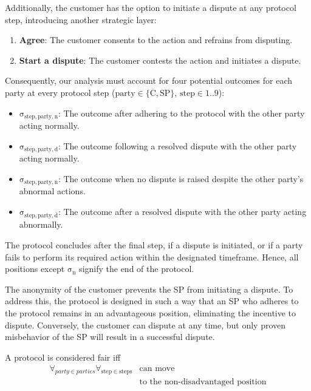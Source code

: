 \documentclass[pdftex,twocolumn,epjc3]{svjour3}
\begin{document}
Additionally, the customer has the option to initiate a dispute at any protocol step, introducing another strategic layer:

\begin{enumerate}
\def\labelenumi{\arabic{enumi}.}
\item \textbf{Agree}: The customer consents to the action and refrains from disputing.
\item \textbf{Start a dispute}: The customer contests the action and initiates a dispute.
\end{enumerate}

\begin{sloppypar}
Consequently, our analysis must account for four potential outcomes for each party at every protocol step ($\mathrm{party \in \{C, SP}\}$, $\mathrm{step \in 1..9}$):
\end{sloppypar}

\begin{itemize}
\item $\mathrm{\sigma_{step,party,n}}$: The outcome after adhering to the protocol with the other party acting normally.
\item $\mathrm{\sigma_{step,party,d}}$: The outcome following a resolved dispute with the other party acting normally.
\item $\mathrm{\sigma_{step,party,\overline{n}}}$: The outcome when no dispute is raised despite the other party's abnormal actions.
\item $\mathrm{\sigma_{step,party,\overline{d}}}$: The outcome after a resolved dispute with the other party acting abnormally.
\end{itemize}

The protocol concludes after the final step, if a dispute is initiated, or if a party fails to perform its required action within the designated timeframe. Hence, all positions except $\mathrm{\sigma_n}$ signify the end of the protocol.

The anonymity of the customer prevents the SP from initiating a dispute. To address this, the protocol is designed in such a way that an SP who adheres to the protocol remains in an advantageous position, eliminating the incentive to dispute. Conversely, the customer can dispute at any time, but only proven misbehavior of the SP will result in a successful dispute.


\begin{definition}[Fairness] \label{def:fairness}
A protocol is considered fair iff 
\begin{equation*}
\begin{split}
\forall_{party \in parties}\forall_{\mathrm{step} \in \mathrm{steps}} &\operatorname{can\ move}\\
&\operatorname{to\ the\ non-disadvantaged\ position} 
\end{split}
\end{equation*}

\end{definition}
\end{document}
